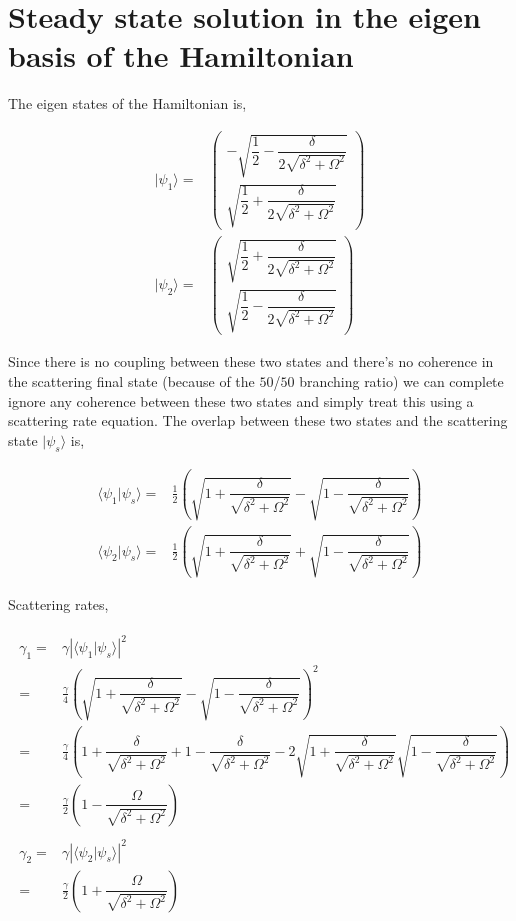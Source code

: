 \documentclass[10pt,fleqn]{article}
\newcommand{\eqar}[1]
{
  \begin{align}
    #1
  \end{align}
}
\newcommand{\paren}[1]{{\left({#1}\right)}}
\newcommand{\abs}[1]{{\left|{#1}\right|}}
\begin{document}
\section{Steady state solution in the eigen basis of the Hamiltonian}
The eigen states of the Hamiltonian is,
\eqar{
  |\psi_1\rangle=&
  \begin{pmatrix}
    -\sqrt{\dfrac12-\dfrac{\delta}{2\sqrt{\delta^2+\Omega^2}}}\\
    \sqrt{\dfrac12+\dfrac{\delta}{2\sqrt{\delta^2+\Omega^2}}}
  \end{pmatrix}\\
  |\psi_2\rangle=&
  \begin{pmatrix}
    \sqrt{\dfrac12+\dfrac{\delta}{2\sqrt{\delta^2+\Omega^2}}}\\
    \sqrt{\dfrac12-\dfrac{\delta}{2\sqrt{\delta^2+\Omega^2}}}
  \end{pmatrix}
}
Since there is no coupling between these two states and there's no coherence
in the scattering final state (because of the $50$/$50$ branching ratio)
we can complete ignore any coherence between these two states and simply treat
this using a scattering rate equation. The overlap between these two states
and the scattering state $|\psi_s\rangle$ is,
\eqar{
  \langle\psi_1|\psi_s\rangle=&\frac{1}{2}\paren{\sqrt{1+\dfrac{\delta}{\sqrt{\delta^2+\Omega^2}}}-\sqrt{1-\dfrac{\delta}{\sqrt{\delta^2+\Omega^2}}}}\\
  \langle\psi_2|\psi_s\rangle=&\frac{1}{2}\paren{\sqrt{1+\dfrac{\delta}{\sqrt{\delta^2+\Omega^2}}}+\sqrt{1-\dfrac{\delta}{\sqrt{\delta^2+\Omega^2}}}}
}
Scattering rates,
\eqar{
  \begin{split}
    \gamma_1=&\gamma\abs{\langle\psi_1|\psi_s\rangle}^2\\
    =&\frac{\gamma}{4}\paren{\sqrt{1+\dfrac{\delta}{\sqrt{\delta^2+\Omega^2}}}-\sqrt{1-\dfrac{\delta}{\sqrt{\delta^2+\Omega^2}}}}^2\\
    =&\frac{\gamma}{4}\paren{1+\dfrac{\delta}{\sqrt{\delta^2+\Omega^2}}+1-\dfrac{\delta}{\sqrt{\delta^2+\Omega^2}}
       -2\sqrt{1+\dfrac{\delta}{\sqrt{\delta^2+\Omega^2}}}\sqrt{1-\dfrac{\delta}{\sqrt{\delta^2+\Omega^2}}}}\\
    =&\frac{\gamma}{2}\paren{1-\dfrac{\Omega}{\sqrt{\delta^2+\Omega^2}}}
  \end{split}\\
  \begin{split}
    \gamma_2=&\gamma\abs{\langle\psi_2|\psi_s\rangle}^2\\
    =&\frac{\gamma}{2}\paren{1+\dfrac{\Omega}{\sqrt{\delta^2+\Omega^2}}}
  \end{split}
}
\end{document}
